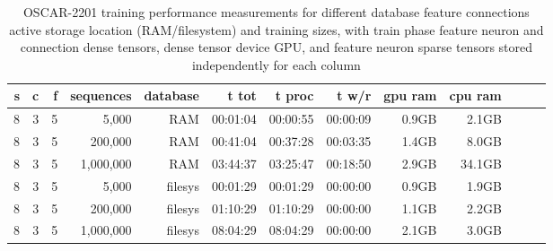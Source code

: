 \begin{table}[H]
\centering
\caption{OSCAR-2201 training performance measurements for different database feature connections active storage location (RAM/filesystem) and training sizes, with train phase feature neuron and connection dense tensors, dense tensor device GPU, and feature neuron sparse tensors stored independently for each column}
\label{tab:oscar-performance-storeDatabaseFeatureNeuronsInRamFalse-storeDatabase}
\begin{tabular}{rrrrrrrrrrrrr}
\toprule
\textbf{s} & \textbf{c} & \textbf{f} & \textbf{sequences} & \textbf{database} & \textbf{t tot} & \textbf{t proc} & \textbf{t w/r} & \textbf{gpu ram} & \textbf{cpu ram} \\
\midrule
8 & 3 & 5 & 5,000       & RAM & 00:01:04 & 00:00:55 & 00:00:09 & 0.9GB & 2.1GB \\
8 & 3 & 5 & 200,000     & RAM & 00:41:04 & 00:37:28 & 00:03:35 & 1.4GB & 8.0GB \\
8 & 3 & 5 & 1,000,000   & RAM & 03:44:37 & 03:25:47 & 00:18:50 & 2.9GB & 34.1GB \\
8 & 3 & 5 & 5,000       & filesys & 00:01:29 & 00:01:29 & 00:00:00 & 0.9GB & 1.9GB \\
8 & 3 & 5 & 200,000     & filesys & 01:10:29 & 01:10:29 & 00:00:00 & 1.1GB & 2.2GB \\
8 & 3 & 5 & 1,000,000   & filesys & 08:04:29 & 08:04:29 & 00:00:00 & 2.1GB & 3.0GB \\
\bottomrule
\end{tabular}
\end{table}



